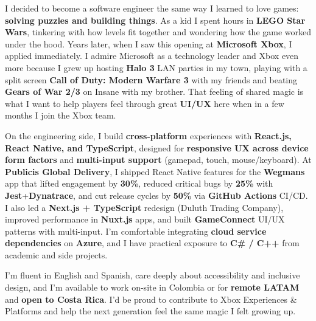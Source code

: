 \documentclass[11pt, a4paper]{awesome-cv}
\begin{document}
\makecvheader[R]
\makelettertitle

\begin{cvletter}

I decided to become a software engineer the same way I learned to love games: \textbf{solving puzzles and building things}. As a kid I spent hours in \textbf{LEGO Star Wars}, tinkering with how levels fit together and wondering how the game worked under the hood. Years later, when I saw this opening at \textbf{Microsoft Xbox}, I applied immediately. I admire Microsoft as a technology leader and Xbox even more because I grew up hosting \textbf{Halo 3} LAN parties in my town, playing with a split screen \textbf{Call of Duty: Modern Warfare 3} with my friends and beating \textbf{Gears of War 2/3} on Insane with my brother. That feeling of shared magic is what I want to help players feel through great \textbf{UI/UX} here when in a few months I join the Xbox team.

On the engineering side, I build \textbf{cross-platform} experiences with \textbf{React.js, React Native, and TypeScript}, designed for \textbf{responsive UX across device form factors} and \textbf{multi-input support} (gamepad, touch, mouse/keyboard). At \textbf{Publicis Global Delivery}, I shipped React Native features for the \textbf{Wegmans} app that lifted engagement by \textbf{30\%}, reduced critical bugs by \textbf{25\%} with \textbf{Jest}+\textbf{Dynatrace}, and cut release cycles by \textbf{50\%} via \textbf{GitHub Actions} CI/CD. I also led a \textbf{Next.js + TypeScript} redesign (Duluth Trading Company), improved performance in \textbf{Nuxt.js} apps, and built \textbf{GameConnect} UI/UX patterns with multi-input. I’m comfortable integrating \textbf{cloud service dependencies} on \textbf{Azure}, and I have practical exposure to \textbf{C\# / C++} from academic and side projects.

I’m fluent in English and Spanish, care deeply about accessibility and inclusive design, and I’m available to work on-site in Colombia or for \textbf{remote LATAM} and \textbf{open to Costa Rica}. I’d be proud to contribute to Xbox Experiences \& Platforms and help the next generation feel the same magic I felt growing up.

\end{cvletter}

\makeletterclosing
\end{document}
